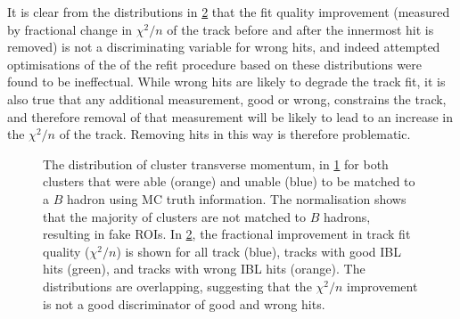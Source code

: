 It is clear from the distributions in \cref{fig:refit chi2 dists} that the fit quality improvement (measured by fractional change in $\chi^2/n$ of the track before and after the innermost hit is removed) is not a discriminating variable for wrong hits, and indeed attempted optimisations of the of the refit procedure based on these distributions were found to be ineffectual. While wrong hits are likely to degrade the track fit, it is also true that any additional measurement, good or wrong, constrains the track, and therefore removal of that measurement will be likely to lead to an increase in the $\chi^2/n$ of the track. Removing hits in this way is therefore problematic.
%
\begin{figure}[!htbp]
    \centering
    \begin{subfigure}{.5\textwidth}
      \centering
      \caption{}
      \label{fig:cluster purity in pt}
    \end{subfigure}%
    \begin{subfigure}{.5\textwidth}
      \centering
      \caption{}
      \label{fig:refit chi2 dists}
    \end{subfigure}
    \caption{The distribution of cluster transverse momentum, in \cref{fig:cluster purity in pt} for both clusters that were able (orange) and unable (blue) to be matched to a $B$ hadron using MC truth information. The normalisation shows that the majority of clusters are not matched to $B$ hadrons, resulting in fake ROIs. In \cref{fig:refit chi2 dists}, the fractional improvement in track fit quality ($\chi^2/n$) is shown for all track (blue), tracks with good IBL hits (green), and tracks with wrong IBL hits (orange). The distributions are overlapping, suggesting that the $\chi^2/n$ improvement is not a good discriminator of good and wrong hits.}
    \label{fig:cluster chi2 info}
\end{figure}
%

